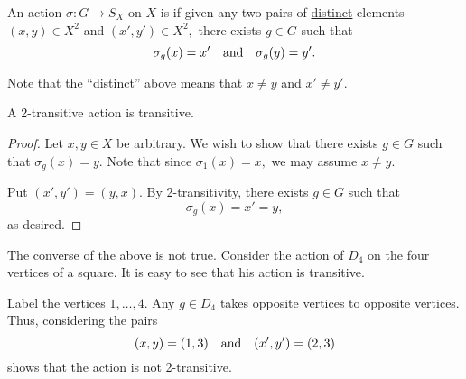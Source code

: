 \begin{defn}%
	An action $\sigma : G \to S_X$ on $X$ is  if given any two pairs of \underline{distinct} elements $(x, y) \in X^2$ and $(x', y') \in X^2,$ there exists $g \in G$ such that
	\begin{equation*} 
		\sigma_g(x) = x' \quad\text{and}\quad \sigma_g(y) = y'.
	\end{equation*}
\end{defn}
Note that the ``distinct'' above means that $x \neq y$ and $x' \neq y'.$ 

\begin{prop} \label{prop:2transistrans}
	A 2-transitive action is transitive.
\end{prop}
\begin{proof} 
	Let $x, y \in X$ be arbitrary. We wish to show that there exists $g \in G$ such that $\sigma_g(x) = y.$ Note that since $\sigma_1(x) = x,$ we may assume $x \neq y.$

	Put $(x', y') = (y, x).$ By 2-transitivity, there exists $g \in G$ such that 
	\begin{equation*} 
		\sigma_g(x) = x' = y,
	\end{equation*}
	as desired.
\end{proof}

\begin{ex}[Action of $D_4$]
	The converse of the above is not true. Consider the action of $D_4$ on the four vertices of a square. It is easy to see that his action is transitive. 

	Label the vertices $1, \ldots, 4.$ Any $g \in D_4$ takes opposite vertices to opposite vertices. Thus, considering the pairs
	\begin{equation*} 
		(x, y) = (1, 3) \quad\text{and}\quad (x', y') = (2, 3)
	\end{equation*}
	shows that the action is not 2-transitive.
\end{ex}

